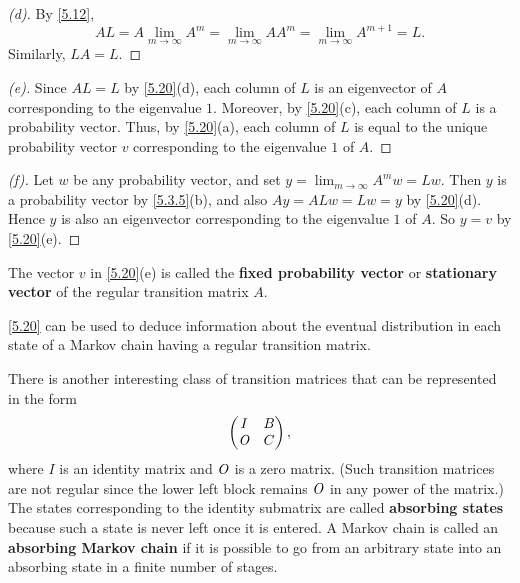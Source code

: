 \begin{proof}[(d)]
	By \cref{5.12},
	\[
		AL = A \lim_{m \to \infty} A^m = \lim_{m \to \infty} AA^m = \lim_{m \to \infty} A^{m + 1} = L.
	\]
	Similarly, \(LA = L\).
\end{proof}

\begin{proof}[(e)]
	Since \(AL = L\) by \cref{5.20}(d), each column of \(L\) is an eigenvector of \(A\) corresponding to the eigenvalue \(1\).
	Moreover, by \cref{5.20}(c), each column of \(L\) is a probability vector.
	Thus, by \cref{5.20}(a), each column of \(L\) is equal to the unique probability vector \(v\) corresponding to the eigenvalue \(1\) of \(A\).
\end{proof}

\begin{proof}[(f)]
	Let \(w\) be any probability vector, and set \(y = \lim_{m \to \infty} A^m w = Lw\).
	Then \(y\) is a probability vector by \cref{5.3.5}(b), and also \(Ay = ALw = Lw = y\) by \cref{5.20}(d).
	Hence \(y\) is also an eigenvector corresponding to the eigenvalue \(1\) of \(A\).
	So \(y = v\) by \cref{5.20}(e).
\end{proof}

\begin{defn}\label{5.3.16}
	The vector \(v\) in \cref{5.20}(e) is called the \textbf{fixed probability vector} or \textbf{stationary vector} of the regular transition matrix \(A\).
\end{defn}

\begin{note}
	\cref{5.20} can be used to deduce information about the eventual distribution in each state of a Markov chain having a regular transition matrix.
\end{note}

\begin{defn}\label{5.3.17}
	There is another interesting class of transition matrices that can be represented in the form
	\[
		\begin{pmatrix}
			I   & B \\
			\mathit{O} & C
		\end{pmatrix},
	\]
	where \(I\) is an identity matrix and \(\mathit{O}\) is a zero matrix.
	(Such transition matrices are not regular since the lower left block remains \(\mathit{O}\) in any power of the matrix.)
	The states corresponding to the identity submatrix are called \textbf{absorbing states} because such a state is never left once it is entered.
	A Markov chain is called an \textbf{absorbing Markov chain} if it is possible to go from an arbitrary state into an absorbing state in a finite number of stages.
\end{defn}

